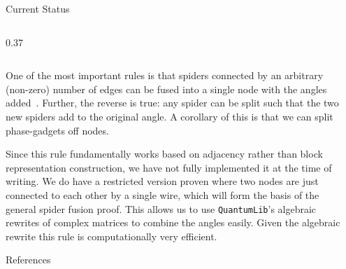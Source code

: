 \documentclass[final]{beamer}
\newlength{\sepwidth}
\newlength{\colwidth}
\newcommand{\separatorcolumn}{\begin{column}{\sepwidth}\end{column}}
\newcommand{\QLib}{\texttt{QuantumLib}\xspace}
\begin{document}
\begin{frame}[t]
\begin{columns}[t]
\begin{column}{\colwidth}
\begin{exampleblock}{Current Status}
\begin{columns}
\begin{column}{0.37\colwidth}
      \end{column}

    \end{columns}

One of the most important rules is that spiders connected by an arbitrary (non-zero) number of edges can be fused into a single node with the angles added~\cite{vandewetering2020zxcalculus}.
%
Further, the reverse is true: any spider can be split such that the two new spiders add to the original angle.
A corollary of this is that we can split phase-gadgets off nodes.

Since this rule fundamentally works based on adjacency rather than block representation construction, we have not fully implemented it at the time of writing.
We do have a restricted version proven where two nodes are just connected to each other by a single wire, which will form the basis of the general spider fusion proof.
This allows us to use \QLib's algebraic rewrites of complex matrices to combine the angles easily.
Given the algebraic rewrite this rule is computationally very efficient.



  \end{exampleblock}

  \begin{block}{References}

    {\tiny }

  \end{block}

\end{column}

\separatorcolumn
\end{columns}
\end{frame}
\end{document}
